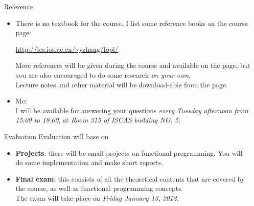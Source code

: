 \documentclass{beamer}
\begin{document}
\begin{frame}{Reference}
\begin{itemize}
\item There is no textbook for the course. I list some reference books on the course page:
\begin{center}
\url{http://lcs.ios.ac.cn/\~yzhang/fopl/}
\end{center}
More references will be given during the course and available on the page, 
but you are also encouraged to do some research \emph{on your own}.
\\
Lecture notes and other material will  be download-able from the page.
\item Me: \\
I will be available for answering your questions {\em every Tuesday afternoon from 15:00 to 18:00}, 
at \emph{Room 315 of ISCAS building NO. 5}.
\end{itemize}
\end{frame}

\begin{frame}{Evaluation}
Evaluation will base on 
\begin{itemize}
\item {\bf Projects}: there will be small projects on functional programming. 
  You will do some implementation and make short reports. 
\item {\bf Final exam}: this consists of all the theoretical contents that are covered by the course, 
  as well as functional programming concepts. \\
  The exam will take place on \emph{Friday January 13, 2012}.
\end{itemize}
\end{frame}
\end{document}
